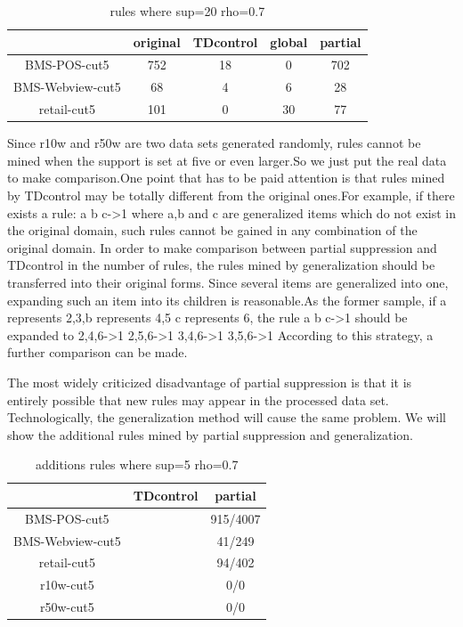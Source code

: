 \documentclass{article}
\begin{document}
\begin{table}
\begin{tabular}{|c|c|c|c|c|}
  \hline
   & original &TDcontrol & global & partial \\ \hline
  BMS-POS-cut5 & 752 &18  & 0& 702 \\ \hline
  BMS-Webview-cut5 &  68& 4&6 & 28 \\ \hline
  retail-cut5 & 101 &0 & 30& 77 \\
  \hline
\end{tabular}
  \caption{ rules where sup=20 rho=0.7}
\end{table}
Since r10w and r50w are two data sets generated randomly, rules cannot be mined when the support is set at five or even larger.So we just put the real data to make comparison.One point that has to be paid attention is that rules mined by TDcontrol may be totally different from the original ones.For example, if there exists a rule: a b c->1 where a,b and c are generalized items which do not exist in the original domain, such rules cannot be gained in any combination of the original domain. In order to make comparison between partial suppression and TDcontrol in the number of rules, the rules mined by generalization should be transferred into their original forms. Since several items are generalized into one, expanding such an item into its children is reasonable.As the former sample, if a represents {2,3},b represents {4,5} c represents {6}, the rule a b c->1 should be expanded to
2,4,6->1
2,5,6->1
3,4,6->1
3,5,6->1
According to this strategy, a further comparison can be made.



The most widely criticized disadvantage of partial suppression is that it is entirely possible that new rules may appear in the processed data set. Technologically, the generalization method will cause the same problem. We will show the additional rules mined by partial suppression and generalization.

\begin{table}
\begin{tabular}{|c|c|c|}
  \hline
   & TDcontrol & partial \\ \hline
  BMS-POS-cut5 &  & 915/4007 \\ \hline
  BMS-Webview-cut5 &  & 41/249 \\ \hline
  retail-cut5  &  & 94/402\\ \hline
  r10w-cut5 &  & 0/0 \\ \hline
  r50w-cut5 & &0/0\\ \hline
  \hline
\end{tabular}
  \caption{additions rules where sup=5 rho=0.7}
\end{table}
\end{document}
